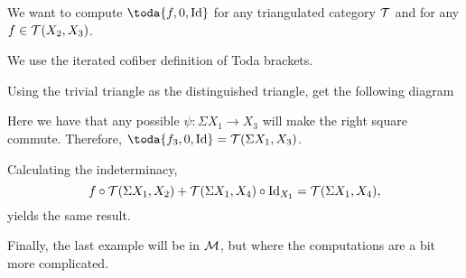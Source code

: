 \begin{example}
	We want to compute \( \toda{f, 0, \Id} \) for any triangulated category \( {\mathcal{T}} \) and for any \( f \in {\mathcal{T}}(X_2, X_3) \).

	We use the iterated cofiber definition of Toda brackets.

	Using the trivial triangle as the distinguished triangle, get the following diagram
	\begin{center}
	\end{center}

	Here we have that any possible \( \psi: \Sigma X_1 \to X_3 \) will make the right square commute. Therefore, \( \toda{f_3, 0, \Id} = \Tc(\Sigma X_1, X_3) \).

	Calculating the indeterminacy,
	\[
		f \circ {\mathcal{T}}(\Sigma X_1, X_2) + {\mathcal{T}}(\Sigma X_1, X_4) \circ \operatorname{Id}_{X_1} = {\mathcal{T}}(\Sigma X_1, X_4),
	\]
	yields the same result.
\end{example}

Finally, the last example will be in \( {\mathcal{M}} \), but where the computations are a bit more complicated.

